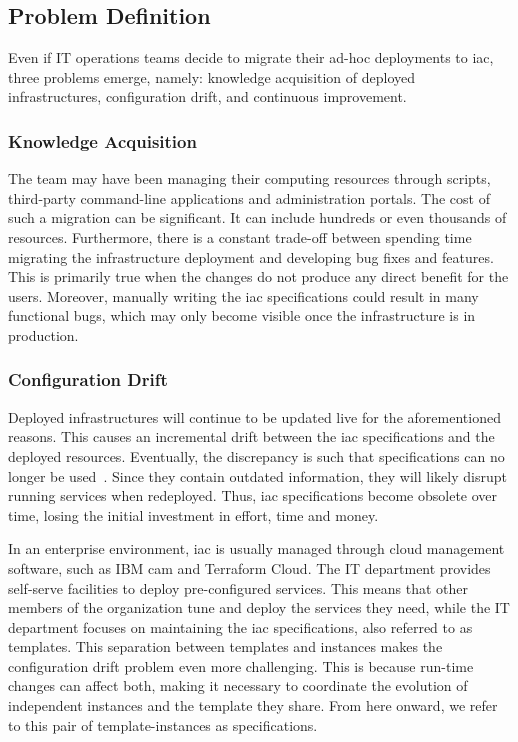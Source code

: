
\subsection{Problem Definition}
\label{subsect:overview--iac-case-study-problem}

Even if IT operations teams decide to migrate their ad-hoc deployments to \gls{iac}, three problems emerge, namely: knowledge acquisition of deployed infrastructures, configuration drift, and continuous improvement.

\subsubsection{Knowledge Acquisition}
\label{subsubsect:overview--iac-case-study-knowledge-acquisition}

The team may have been managing their computing resources through scripts, third-party command-line applications and administration portals. The cost of such a migration can be significant. It can include hundreds or even thousands of resources. Furthermore, there is a constant trade-off between spending time migrating the infrastructure deployment and developing bug fixes and features. This is primarily true when the changes do not produce any direct benefit for the users. Moreover, manually writing the \gls{iac} specifications could result in many functional bugs, which may only become visible once the infrastructure is in production.

\subsubsection{Configuration Drift}
\label{subsubsect:overview--iac-case-study-configuration-drift}

Deployed infrastructures will continue to be updated live for the aforementioned reasons. This causes an incremental drift between the \gls{iac} specifications and the deployed resources. Eventually, the discrepancy is such that specifications can no longer be used~\cite{morris-2016-infrastructure}. Since they contain outdated information, they will likely disrupt running services when redeployed. Thus, \gls{iac} specifications become obsolete over time, losing the initial investment in effort, time and money.

In an enterprise environment, \gls{iac} is usually managed through cloud management software, such as IBM \gls{cam} and Terraform Cloud. The IT department provides self-serve facilities to deploy pre-configured services. This means that other members of the organization tune and deploy the services they need, while the IT department focuses on maintaining the \gls{iac} specifications, also referred to as templates. This separation between templates and instances makes the configuration drift problem even more challenging. This is because run-time changes can affect both, making it necessary to coordinate the evolution of independent instances and the template they share. From here onward, we refer to this pair of template-instances as specifications.

